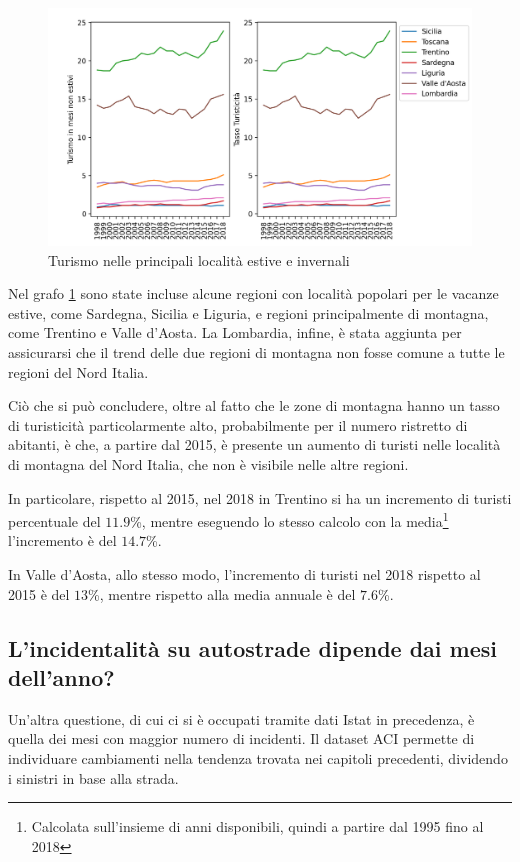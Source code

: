 \documentclass[a4paper]{report}
\begin{document}
\begin{figure}
    \includegraphics[width=\linewidth]{../src/turismo/turismo.png}
    \caption{Turismo nelle principali località estive e invernali}
    \label{fig:turismo}
\end{figure}

Nel grafo \ref{fig:turismo} sono state incluse alcune regioni con località popolari 
per le vacanze estive, come Sardegna, Sicilia e Liguria, e regioni principalmente 
di montagna, come Trentino e Valle d'Aosta. 
La Lombardia, infine, è stata aggiunta per assicurarsi che il trend delle due regioni 
di montagna non fosse comune a tutte le regioni del Nord Italia.

Ciò che si può concludere, oltre al fatto che le zone di montagna hanno 
un tasso di turisticità particolarmente alto, probabilmente per il numero 
ristretto di abitanti, 
è che, a partire dal 2015, è presente un aumento di turisti nelle località 
di montagna del Nord Italia, che non è visibile nelle altre regioni.

In particolare, rispetto al 2015, nel 2018 in Trentino si ha un incremento 
di turisti percentuale del $11.9$\%, mentre eseguendo lo stesso calcolo con la 
media\footnote{Calcolata sull'insieme di anni disponibili, quindi 
a partire dal 1995 fino al 2018} l'incremento è del $14.7$\%.

In Valle d'Aosta, allo stesso modo, l'incremento di turisti nel 2018 
rispetto al 2015 è del $13$\%, mentre rispetto alla media annuale 
è del $7.6$\%.

\subsection{L'incidentalità su autostrade dipende dai mesi dell'anno?}

Un'altra questione, di cui ci si è occupati tramite dati Istat in precedenza, è 
quella dei mesi con maggior numero di incidenti.
Il dataset ACI permette di individuare cambiamenti nella tendenza trovata nei 
capitoli precedenti, dividendo i sinistri in base alla strada.
\end{document}
